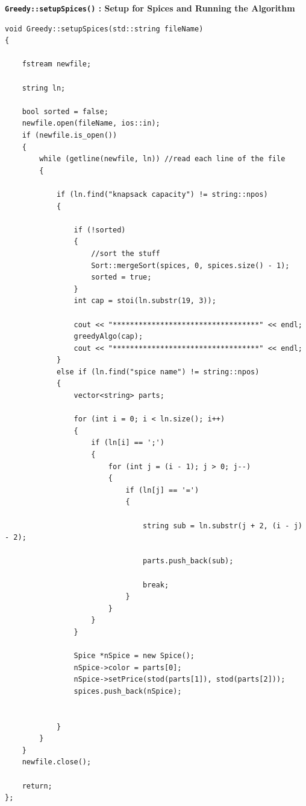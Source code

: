 \documentclass[letterpaper, 10pt]{article}
\begin{document}
\textbf{\texttt{Greedy::setupSpices()} : Setup for Spices and Running the Algorithm}
 \begin{addmargin}[-5em]{1em}
\begin{small}
\begin{verbatim}
void Greedy::setupSpices(std::string fileName)
{

    fstream newfile;

    string ln;

    bool sorted = false;
    newfile.open(fileName, ios::in);
    if (newfile.is_open())
    {
        while (getline(newfile, ln)) //read each line of the file
        {

            if (ln.find("knapsack capacity") != string::npos)
            {

                if (!sorted)
                {
                    //sort the stuff
                    Sort::mergeSort(spices, 0, spices.size() - 1);
                    sorted = true;
                }
                int cap = stoi(ln.substr(19, 3));

                cout << "**********************************" << endl;
                greedyAlgo(cap);
                cout << "**********************************" << endl;
            }
            else if (ln.find("spice name") != string::npos)
            {
                vector<string> parts;

                for (int i = 0; i < ln.size(); i++)
                {
                    if (ln[i] == ';')
                    {
                        for (int j = (i - 1); j > 0; j--)
                        {
                            if (ln[j] == '=')
                            {

                                string sub = ln.substr(j + 2, (i - j) - 2);

                                parts.push_back(sub);
                                
                                break;
                            }
                        }
                    }
                }

                Spice *nSpice = new Spice();
                nSpice->color = parts[0];
                nSpice->setPrice(stod(parts[1]), stod(parts[2]));
                spices.push_back(nSpice);

               
            }
        }
    }
    newfile.close();

    return;
};
\end{verbatim}
\end{small}
\end{addmargin}   
\end{document}
